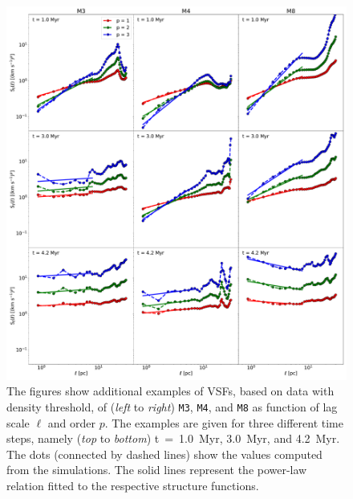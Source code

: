 \begin{figure}
    \centering
    \includegraphics[width=\textwidth]{app_examples_wthres_s_l.pdf}
    \caption{
        The figures show additional examples of VSFs, based on data with density threshold, of (\textit{left} to \textit{right}) \texttt{M3}, \texttt{M4}, and \texttt{M8} as function of lag scale $\ell$ and order $p$. 
        The examples are given for three different time steps, namely (\textit{top} to \textit{bottom}) t~=~1.0~Myr, 3.0~Myr, and 4.2~Myr.
        The dots (connected by dashed lines) show the values computed from the simulations. 
        The solid lines represent the power-law relation fitted to the respective structure functions.
    }
    \label{pic:appFigures:examples_with_threshold_s_vs_l}
\end{figure}
 	
